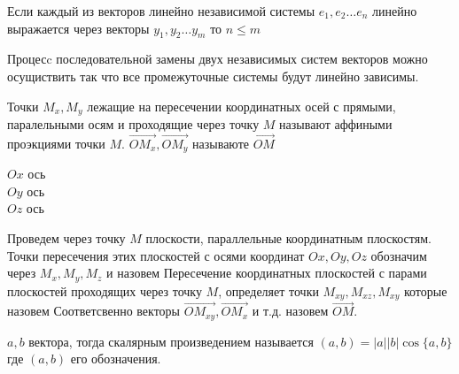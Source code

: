 \begin{theorem}
  Если каждый из векторов линейно независимой системы $e_1, e_2 \ldots e_n$
линейно выражается через векторы $y_1, y_2 \ldots y_m$ то $n \le m$
\end{theorem}

\begin{theorem}
  Процесc последовательной замены двух независимых систем векторов можно
осущиствить так что все промежуточные системы будут линейно зависимы.
\end{theorem}

\begin{defin}
  Точки $M_x, M_y$ лежащие на пересечении координатных осей с прямыми,
  паралельными осям и проходящие через точку $M$ называют аффиными проэкциями
  точки $M$. $\vec{OM_x}, \vec{OM_y}$ называюте 
  $\vec{OM}$
\end{defin}

$Ox$ ось \\
$Oy$ ось \\
$Oz$ ось 

\begin{defin}
  Проведем через точку $M$ плоскости, параллельные координатным плоскостям.
  Точки пересечения этих плоскостей с осями координат $Ox, Oy, Oz$ обозначим
  через $M_x, M_y, M_z$ и назовем
   Пересечение координатных
  плоскостей с парами плоскостей проходящих через точку $M$, определяет точки
  $M_{xy}, M_{xz}, M_{xy}$ которые назовем
   Соответсвенно
  векторы $\vec{OM_{xy}}, \vec{OM_x}$ и т.д. назовем
   $\vec{OM}$.
\end{defin}

\begin{defin}
  $a,b$ вектора, тогда скалярным произведением называется
  $(a,b) = |a||b|\cos\{a,b\}$ где $(a,b)$ его обозначения.
\end{defin}

